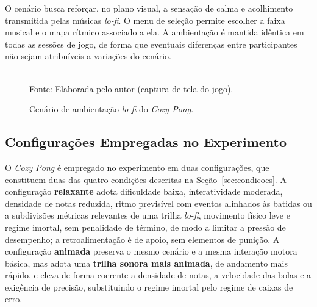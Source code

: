 O cenário busca reforçar, no plano visual, a sensação de calma e acolhimento transmitida pelas músicas \textit{lo-fi}.  O menu de seleção permite escolher a faixa musical e o mapa rítmico associado a ela. A ambientação é mantida idêntica em todas as sessões de jogo, de forma que eventuais diferenças entre participantes não sejam atribuíveis a variações do cenário.

\begin{figure}[H]
    \centering
    \caption{Cenário de ambientação \textit{lo-fi} do \textit{Cozy Pong}. }
    \label{fig:cenario}
    \\[2pt]
    {\footnotesize Fonte: Elaborada pelo autor (captura de tela do jogo).}
\end{figure}

\subsection{Configurações Empregadas no Experimento}\label{subsec:config-experimento}

O \textit{Cozy Pong} é empregado no experimento em duas configurações, que constituem duas das quatro condições descritas na Seção~\ref{sec:condicoes}. A configuração \textbf{relaxante} adota dificuldade baixa, interatividade moderada, densidade de notas reduzida, ritmo previsível com eventos alinhados às batidas ou a subdivisões métricas relevantes de uma trilha \textit{lo-fi}, movimento físico leve e regime imortal, sem penalidade de término, de modo a limitar a pressão de desempenho; a retroalimentação é de apoio, sem elementos de punição. A configuração \textbf{animada} preserva o mesmo cenário e a mesma interação motora básica, mas adota uma \textbf{trilha sonora mais animada}, de andamento mais rápido, e eleva de forma coerente a densidade de notas, a velocidade das bolas e a exigência de precisão, substituindo o regime imortal pelo regime de caixas de erro.

